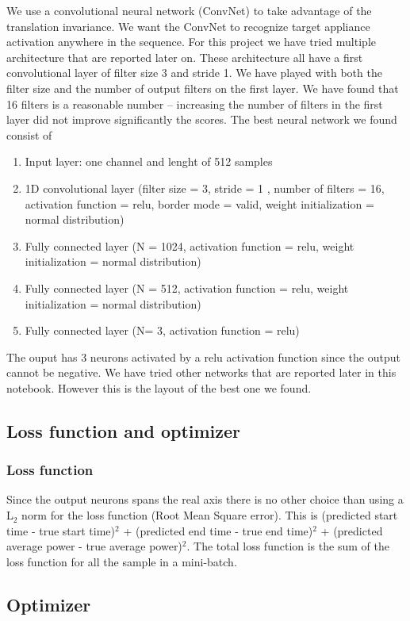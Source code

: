 \documentclass[10pt]{article}
\begin{document}
We use a convolutional neural network (ConvNet) to take advantage of the translation invariance. We want the ConvNet to recognize target appliance activation anywhere in the sequence. For this project we have tried multiple architecture that are reported later on. These architecture all have a first convolutional layer of filter size 3 and stride 1. We have played with both the filter size and the number of output filters on the first layer. We have found that 16 filters is a reasonable number -- increasing the number of filters in the first layer did not improve significantly the scores.
The best neural network we found consist of
\begin{enumerate}
\item Input layer: one channel and lenght of 512 samples
\item 1D convolutional layer (filter size = 3, stride = 1 , number of filters = 16, activation function = relu, border mode = valid, weight initialization = normal distribution)
\item Fully connected layer (N = 1024, activation function = relu, weight initialization = normal distribution)
\item Fully connected layer (N = 512, activation function = relu, weight initialization = normal distribution)
\item Fully connected layer (N= 3, activation function = relu)
\end{enumerate}
The ouput has 3 neurons activated by a relu activation function since the output cannot be negative. We have tried other networks that are reported later in this notebook. However this is the layout of the best one we found.


\subsection{Loss function and optimizer}
\subsubsection{Loss function}
Since the output neurons spans the real axis there is no other choice than using a L$_2$ norm for the loss function (Root Mean Square error). This is (predicted start time - true start time)$^2$ + (predicted end time - true end time)$^2$ + (predicted average power - true average power)$^2$. The total loss function is the sum of the loss function for all the sample in a mini-batch.


\subsection{Optimizer}
\end{document}
